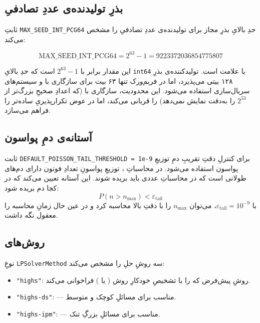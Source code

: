 \subsection{بذرِ تولیدنده‌ی عددِ تصادفیِ }

ثابتِ \texttt{MAX\_SEED\_INT\_PCG64} حدِ بالایِ بذرِ مجاز برای تولیدنده‌ی عددِ تصادفیِ  را مشخص می‌کند:

\begin{equation}
	\text{MAX\_SEED\_INT\_PCG64} = 2^{63} - 1 = 9223372036854775807
\end{equation}

این مقدار برابر با $2^{63} - 1$ است که حدِ بالایِ \texttt{int64} با علامت است. تولیدکننده‌ی  بذرِ ۱۲۸ بیتی می‌پذیرد، اما در فریم‌ورک تنها ۶۳ بیت برای سازگاری با  و سیستم‌های سریال‌سازی استفاده می‌شود. این محدودیت، سازگاری با  (که اعدادِ صحیحِ بزرگ‌تر از $2^{53}$ را به‌دقت نمایش نمی‌دهد) را قربانی می‌کند، اما در عوض تکرارپذیریِ ساده‌تر را فراهم می‌سازد.

\subsection{آستانه‌ی دمِ پواسون}

ثابت \texttt{DEFAULT\_POISSON\_TAIL\_THRESHOLD = 1e-9} برای کنترلِ دقتِ تقریبِ دمِ توزیعِ پواسون استفاده می‌شود. در محاسباتِ ، توزیعِ پواسونِ تعدادِ فوتون دارای دم‌های طولانی است که در محاسباتِ عددی باید بریده شوند. این آستانه تعیین می‌کند که در کجا دم بریده شود:
\begin{equation}
	P(n > n_{\text{max}}) < \varepsilon_{\text{tail}}
\end{equation}
با $\varepsilon_{\text{tail}} = 10^{-9}$، می‌توان $n_{\text{max}}$ را با دقتِ بالا محاسبه کرد و در عین حال زمانِ محاسبه را معقول نگه داشت.

\subsection{روش‌های }

نوعِ \texttt{LPSolverMethod} سه روشِ حلِ  را مشخص می‌کند:
\begin{itemize}
	\item \texttt{"highs"}: روشِ پیش‌فرض که  را با تشخیصِ خودکارِ روش ( یا ) فراخوانی می‌کند.
	\item \texttt{"highs-ds"}:  — مناسب برای مسائلِ کوچک و متوسط.
	\item \texttt{"highs-ipm"}:  — مناسب برای مسائلِ بزرگِ تنک.
\end{itemize}


